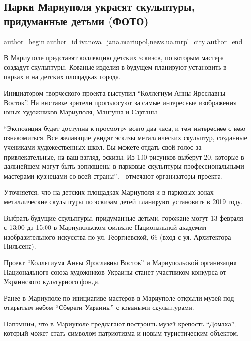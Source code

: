  
 
 
 
 
 
\subsection{Парки Мариуполя украсят скульптуры, придуманные детьми (ФОТО)}
\label{sec:12_02_2019.stz.news.ua.mrpl_city.2.parki_mrpl_skulptury_ukrashennie_detmi}
 
\ifcmt
 author_begin
   author_id ivanova_jana.mariupol,news.ua.mrpl_city
 author_end
\fi

В Мариуполе представят коллекцию детских эскизов, по которым мастера создадут
скульптуры. Кованые изделия в будущем планируют установить в парках и на
детских площадках города.

Инициатором творческого проекта выступил \enquote{Коллегиум Анны Ярославны Восток}. На
выставке зрители проголосуют за самые интересные изображения юных художников
Мариуполя, Мангуша и Сартаны.

\enquote{Экспозиция будет доступна к просмотру всего два часа, и тем интереснее с нею
ознакомиться. Все желающие увидят эскизы металлических скульптур, созданные
учениками художественных школ. Вы можете отдать свой голос за привлекательные,
на ваш взгляд, эскизы. Из 100 рисунков выберут 20, которые в дальнейшем могут
быть воплощены в парковые скульптуры профессиональными мастерами-кузнецами со
всей страны}, - отмечают организаторы проекта.

Уточняется, что на детских площадках Мариуполя и в парковых зонах металлические
скульптуры по эскизам детей планируют установить в 2019 году.

Выбрать будущие скульптуры, придуманные детьми, горожане могут 13 февраля с
13:00 до 15:00 в Мариупольском филиале Национальной академии изобразительного
искусства по ул. Георгиевской, 69 (вход с ул. Архитектора Нильсена).

Проект \enquote{Коллегиума Анны Ярославны Восток} и Мариупольской организации
Национального союза художников Украины станет участником конкурса от
Украинского культурного фонда.

Ранее в Мариуполе по инициативе мастеров в Мариуполе открыли музей под открытым
небом \enquote{Обереги Украины} с коваными скульптурами.

Напомним, что в Мариуполе предлагают построить музей-крепость \enquote{Домаха}, который
может стать символом патриотизма и новым туристическим объектом.
